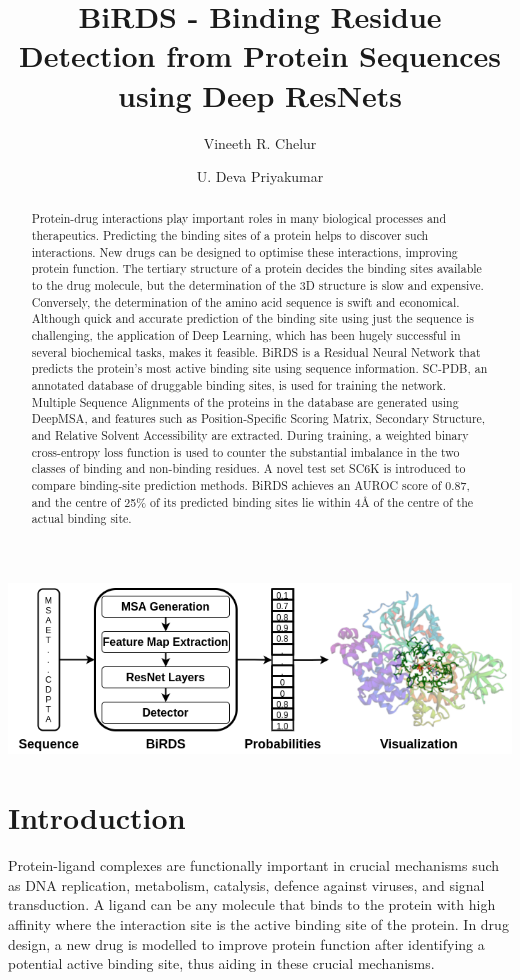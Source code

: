 \documentclass[journal=jcisd8,manuscript=article]{achemso}
\author{Vineeth R. Chelur}
\author{U. Deva Priyakumar}
\affiliation[IIIT-H]
{Center for Computational Natural Sciences \& Bioinformatics \\ International Institute of Information Technology \\ Hyderabad - 500032, India}
\title[BiRDS - Binding Residue Detection from Protein Sequences using Deep ResNets]
  {BiRDS - Binding Residue Detection from Protein Sequences using Deep ResNets
  }
\begin{document}
\begin{tocentry}
    \centering
    \includegraphics[width=\textwidth,height=0.15\textheight]{graphical_toc}
\end{tocentry}

\begin{abstract}
    \noindent Protein-drug interactions play important roles in many biological processes and therapeutics. Predicting the binding sites of a protein helps to discover such interactions. New drugs can be designed to optimise these interactions, improving protein function. The tertiary structure of a protein decides the binding sites available to the drug molecule, but the determination of the 3D structure is slow and expensive. Conversely, the determination of the amino acid sequence is swift and economical. Although quick and accurate prediction of the binding site using just the sequence is challenging, the application of Deep Learning, which has been hugely successful in several biochemical tasks, makes it feasible. BiRDS is a Residual Neural Network that predicts the protein's most active binding site using sequence information. SC-PDB, an annotated database of druggable binding sites, is used for training the network. Multiple Sequence Alignments of the proteins in the database are generated using DeepMSA, and features such as Position-Specific Scoring Matrix, Secondary Structure, and Relative Solvent Accessibility are extracted. During training, a weighted binary cross-entropy loss function is used to counter the substantial imbalance in the two classes of binding and non-binding residues. A novel test set SC6K is introduced to compare binding-site prediction methods. BiRDS achieves an AUROC score of 0.87, and the centre of 25\% of its predicted binding sites lie within 4{\AA} of the centre of the actual binding site.
\end{abstract}

\section{Introduction}
\quad Protein-ligand complexes are functionally important in crucial mechanisms such as DNA replication, metabolism, catalysis, defence against viruses, and signal transduction. A ligand can be any molecule that binds to the protein with high affinity where the interaction site is the active binding site of the protein. In drug design, a new drug is modelled to improve protein function after identifying a potential active binding site, thus aiding in these crucial mechanisms.
\end{document}
